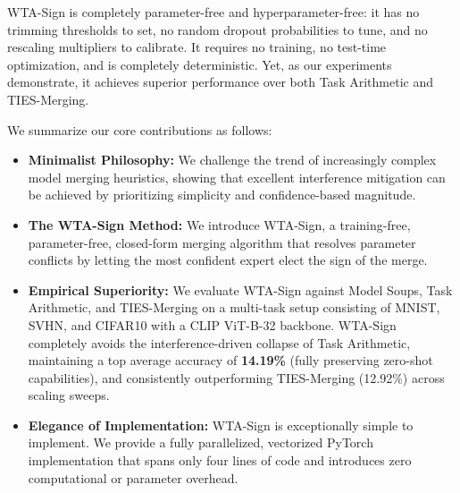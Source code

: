 WTA-Sign is completely parameter-free and hyperparameter-free: it has no trimming thresholds to set, no random dropout probabilities to tune, and no rescaling multipliers to calibrate.
It requires no training, no test-time optimization, and is completely deterministic.
Yet, as our experiments demonstrate, it achieves superior performance over both Task Arithmetic and TIES-Merging.

We summarize our core contributions as follows:
\begin{itemize}
    \item \textbf{Minimalist Philosophy:} We challenge the trend of increasingly complex model merging heuristics, showing that excellent interference mitigation can be achieved by prioritizing simplicity and confidence-based magnitude.
    \item \textbf{The WTA-Sign Method:} We introduce WTA-Sign, a training-free, parameter-free, closed-form merging algorithm that resolves parameter conflicts by letting the most confident expert elect the sign of the merge.
    \item \textbf{Empirical Superiority:} We evaluate WTA-Sign against Model Soups, Task Arithmetic, and TIES-Merging on a multi-task setup consisting of \mbox{MNIST}, \mbox{SVHN}, and \mbox{CIFAR10} with a CLIP \mbox{ViT-B-32} backbone. WTA-Sign completely avoids the interference-driven collapse of Task Arithmetic, maintaining a top average accuracy of \textbf{14.19\%} (fully preserving zero-shot capabilities), and consistently outperforming TIES-Merging (12.92\%) across scaling sweeps.
    \item \textbf{Elegance of Implementation:} WTA-Sign is exceptionally simple to implement. We provide a fully parallelized, vectorized PyTorch implementation that spans only four lines of code and introduces zero computational or parameter overhead.
\end{itemize}

